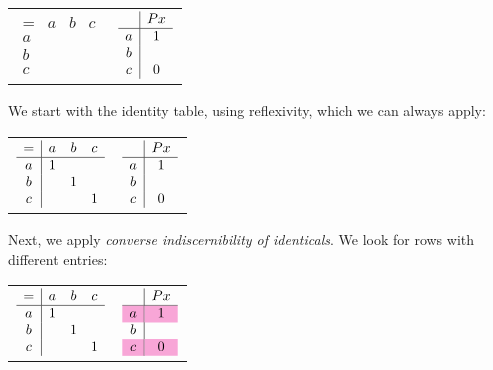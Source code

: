 \documentclass[PHIL101-Textbook.tex]{subfiles}
\begin{document}
\begin{center}
  \begin{tabular}{ll}
  $\begin{array}{c|ccc}
	 = & a & b & c\\ \hline
	 a && \\
	 b \\
	 c
	 \end{array}$
&
	$\begin{array}{c|c}
	   & \mathord{P}{x} \\ \hline
	 a & 1\\
	 b & \\
	 c & 0
	 \end{array}$
  \end{tabular}
\end{center}

\noindent We start with the identity table, using reflexivity, which we can always apply: 

\begin{center}
  \begin{tabular}{ll}
  $\begin{array}{c|ccc}
	 = & a & b & c\\ \hline
	 a &1&   &\\
	 b &   &1&\\
	 c &   &   &1
	 \end{array}$
&
	$\begin{array}{c|c}
	   & \mathord{P}{x} \\ \hline
	 a & 1\\
	 b & \\
	 c & 0
	 \end{array}$
  \end{tabular}
\end{center}

\noindent Next, we apply \emph{converse indiscernibility of identicals}. We look for rows with different entries:

\begin{center}
  \begin{tabular}{ll}
  $\begin{array}{c|ccc}
	 = & a & b & c\\ \hline
	 a &1&   &\\
	 b &   &1&\\
	 c &   &   &1
	 \end{array}$
&
	$\begin{array}{c|c}
							  & \atom P x \\ \hline
	 \cellcolor{magenta!35} a & \cellcolor{magenta!35}\vT\\
							b & \\
	 \cellcolor{magenta!35} c & \cellcolor{magenta!35}\vF
	\end{array}$
  \end{tabular}
\end{center}
\end{document}
